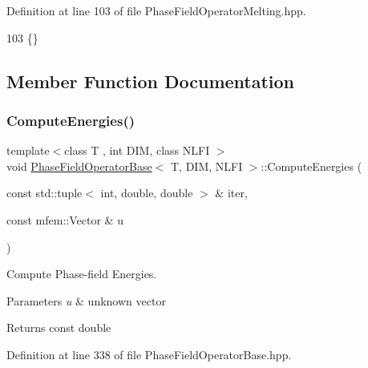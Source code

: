 Definition at line 103 of file Phase\+Field\+Operator\+Melting.\+hpp.


\begin{DoxyCode}
103 \{\}
\end{DoxyCode}


\subsection{Member Function Documentation}
\mbox{\label{classPhaseFieldOperatorBase_ac313363a74691d6b500191ff475b57fb}} 
\subsubsection{\texorpdfstring{Compute\+Energies()}{ComputeEnergies()}}
{\footnotesize\ttfamily template$<$class T , int D\+IM, class N\+L\+FI $>$ \\
void \hyperlink{classPhaseFieldOperatorBase}{Phase\+Field\+Operator\+Base}$<$ T, D\+IM, N\+L\+FI $>$\+::Compute\+Energies (\begin{DoxyParamCaption}\item[{const std\+::tuple$<$ int, double, double $>$ \&}]{iter,  }\item[{const mfem\+::\+Vector \&}]{u }\end{DoxyParamCaption})\hspace{0.3cm}{\ttfamily [inherited]}}



Compute Phase-\/field Energies. 


\begin{DoxyParams}{Parameters}
{\em u} & unknown vector \\
\hline
\end{DoxyParams}
\begin{DoxyReturn}{Returns}
const double 
\end{DoxyReturn}


Definition at line 338 of file Phase\+Field\+Operator\+Base.\+hpp.


